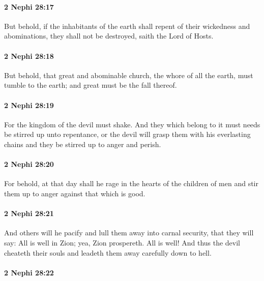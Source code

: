 		\paragraph{2 Nephi 28:17} %
			\label{2NEPHI-28-17}

			But behold, if the inhabitants of the earth shall repent
			of their wickedness and abominations,
			they shall not be destroyed, saith the Lord of Hosts.

		\paragraph{2 Nephi 28:18} %
			\label{2NEPHI-28-18}

			But behold, that great and abominable church,
			the whore of all the earth,
			must tumble to the earth;
			and great must be the fall thereof.

		\paragraph{2 Nephi 28:19} %
			\label{2NEPHI-28-19}

			For the kingdom of the devil must shake.
			And they which belong to it must needs be stirred up unto repentance,
			or the devil will grasp them with his everlasting chains
			and they be stirred up to anger and perish.

		\paragraph{2 Nephi 28:20} %
			\label{2NEPHI-28-20}

			For behold, at that day shall he rage in the hearts of the children of men
			and stir them up to anger against that which is good.

		\paragraph{2 Nephi 28:21} %
			\label{2NEPHI-28-21}

			And others will he pacify and lull them away into carnal security,
			that they will say:
			All is well in Zion;
			yea, Zion prospereth.
			All is well!
			And thus the devil cheateth their souls
			and leadeth them away carefully down to hell.

		\paragraph{2 Nephi 28:22} %
			\label{2NEPHI-28-22}

